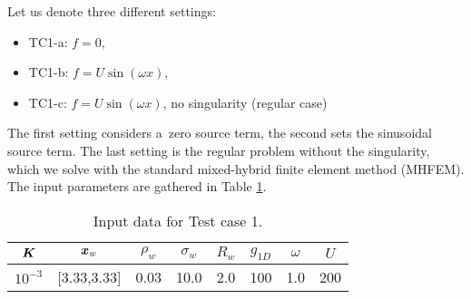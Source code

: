 Let us denote three different settings: 
\begin{itemize}
    \item TC1-a: $f=0$,
    \item TC1-b: $f=U\sin(\omega x)$,
    \item TC1-c: $f=U\sin(\omega x)$, no singularity (regular case)
\end{itemize}
The first setting considers a~zero source term,
the second sets the sinusoidal source term.
The last setting is the regular problem without the singularity, which we solve with
the standard mixed-hybrid finite element method (MHFEM).
The input parameters are gathered in Table \ref{tab:tc1_data}.
%
\begin{table}[!hb]
\begin{center}
\begin{tabular}{cccccccc}
\toprule
$\mathbf{\boldsymbol{K}}$ & $\mathbf{\boldsymbol{x}}_w$  & $\rho_w$ & $\sigma_w$ & $R_w$ & $g_{1D}$ & $\omega$ & $U$ \\
\midrule
$10^{-3}$ & [3.33,3.33] & 0.03 & 10.0 & 2.0 & 100 & 1.0 & 200\\
\bottomrule
\end{tabular}
\caption{Input data for Test case 1.}
\label{tab:tc1_data}
\end{center}
\end{table}

